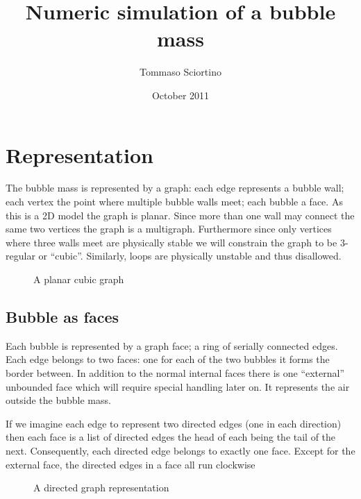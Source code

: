 \documentclass{article}
\title{Numeric simulation of a bubble mass}
\author{Tommaso Sciortino}
\date{October 2011}
\begin{document}
\maketitle
\section{Representation}
The bubble mass is represented by a graph: each edge represents a bubble wall;
each vertex the point where multiple bubble walls meet; each bubble a face. As
this is a 2D model the graph is planar. Since more than one wall may connect the same
two vertices the graph is a multigraph. Furthermore since only vertices where
three walls meet are physically stable we will constrain the graph to be
3-regular or ``cubic''. Similarly, loops are physically
unstable and thus disallowed.
\begin{figure}[h]
\centering
{}
\caption{A planar cubic graph}
\end{figure}

\subsection{Bubble as faces}
Each bubble is represented by a graph face; a ring of serially connected edges.
Each edge belongs to two faces: one for each of the two bubbles it forms the
border between. In addition to the normal internal faces there is one
``external'' unbounded face which will require special handling later on. It
represents the air outside the bubble mass.

If we imagine each edge to represent two directed edges (one in each direction)
then each face is a list of directed edges the head of each being
the tail of the next. Consequently, each directed edge belongs to exactly one
face. Except for the external face, the directed
edges in a face all run clockwise \begin{figure}[h]
\centering
{}
\caption{A directed graph representation}
\end{figure}
\end{document}
